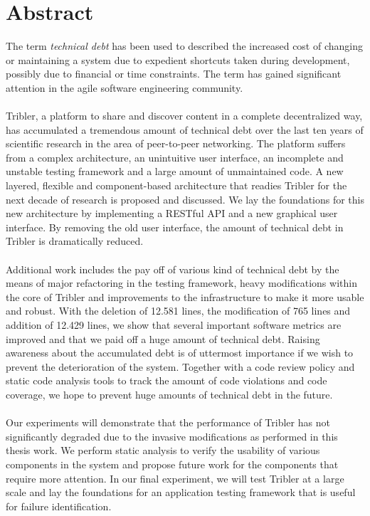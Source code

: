 \chapter*{Abstract}
The term \emph{technical debt} has been used to described the increased cost of changing or maintaining a system due to expedient shortcuts taken during development, possibly due to financial or time constraints. The term has gained significant attention in the agile software engineering community.\\\\
Tribler, a platform to share and discover content in a complete decentralized way, has accumulated a tremendous amount of technical debt over the last ten years of scientific research in the area of peer-to-peer networking.
The platform suffers from a complex architecture, an unintuitive user interface, an incomplete and unstable testing framework and a large amount of unmaintained code.
A new layered, flexible and component-based architecture that readies Tribler for the next decade of research is proposed and discussed.
We lay the foundations for this new architecture by implementing a RESTful API and a new graphical user interface. By removing the old user interface, the amount of technical debt in Tribler is dramatically reduced.\\\\
Additional work includes the pay off of various kind of technical debt by the means of major refactoring in the testing framework, heavy modifications within the core of Tribler and improvements to the infrastructure to make it more usable and robust.
With the deletion of 12.581 lines, the modification of 765 lines and addition of 12.429 lines, we show that several important software metrics are improved and that we paid off a huge amount of technical debt. 
Raising awareness about the accumulated debt is of uttermost importance if we wish to prevent the deterioration of the system.
Together with a code review policy and static code analysis tools to track the amount of code violations and code coverage, we hope to prevent huge amounts of technical debt in the future.\\\\
Our experiments will demonstrate that the performance of Tribler has not significantly degraded due to the invasive modifications as performed in this thesis work. We perform static analysis to verify the usability of various components in the system and propose future work for the components that require more attention. In our final experiment, we will test Tribler at a large scale and lay the foundations for an application testing framework that is useful for failure identification.